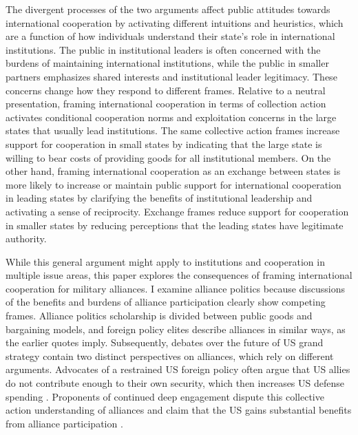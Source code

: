 \documentclass[12pt]{article}
\begin{document}
The divergent processes of the two arguments affect public attitudes towards international cooperation by activating different intuitions and heuristics, which are a function of how individuals understand their state's role in international institutions. 
The public in institutional leaders is often concerned with the burdens of maintaining international institutions, while the public in smaller partners emphasizes shared interests and institutional leader legitimacy.
These concerns change how they respond to different frames. 
Relative to a neutral presentation, framing international cooperation in terms of collection action activates conditional cooperation norms and exploitation concerns in the large states that usually lead institutions. 
The same collective action frames increase support for cooperation in small states by indicating that the large state is willing to bear costs of providing goods for all institutional members. 
On the other hand, framing international cooperation as an exchange between states is more likely to increase or maintain public support for international cooperation in leading states by clarifying the benefits of institutional leadership and activating a sense of reciprocity. 
Exchange frames reduce support for cooperation in smaller states by reducing perceptions that the leading states have legitimate authority.  


While this general argument might apply to institutions and cooperation in multiple issue areas, this paper explores the consequences of framing international cooperation for military alliances. 
I examine alliance politics because discussions of the benefits and burdens of alliance participation clearly show competing frames. 
Alliance politics scholarship is divided between public goods and bargaining models, and foreign policy elites describe alliances in similar ways, as the earlier quotes imply. 
Subsequently, debates over the future of US grand strategy contain two distinct perspectives on alliances, which rely on different arguments. 
Advocates of a restrained US foreign policy often argue that US allies do not contribute enough to their own security, which then increases US defense spending \citep{Preble2009, Posen2014}.
Proponents of continued deep engagement dispute this collective action understanding of alliances and claim that the US gains substantial benefits from alliance participation \citep{BrooksWohlforth2008, BrandsFeaver2017}. 
\end{document}
